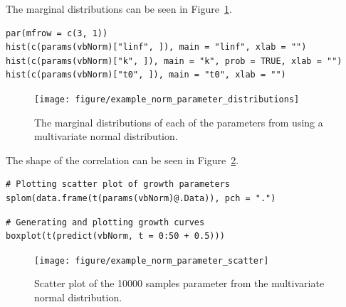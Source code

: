\documentclass[a4paper,english,10pt]{article}\usepackage[]{graphicx}\usepackage[]{color}
\makeatletter
\newenvironment{kframe}{%
 \def\at@end@of@kframe{}%
 \ifinner\ifhmode%
  \def\at@end@of@kframe{\end{minipage}}%
  \begin{minipage}{\columnwidth}%
 \fi\fi%
 \def\FrameCommand##1{\hskip\@totalleftmargin \hskip-\fboxsep
 \colorbox{shadecolor}{##1}\hskip-\fboxsep
     \hskip-\linewidth \hskip-\@totalleftmargin \hskip\columnwidth}%
 \MakeFramed {\advance\hsize-\width
   \@totalleftmargin\z@ \linewidth\hsize
   \@setminipage}}%
 {\par\unskip\endMakeFramed%
 \at@end@of@kframe}
\newenvironment{knitrout}{}{} %
\makeatother
\begin{document}
The marginal distributions can be seen in Figure~\ref{fig:plot_norm_params}.
\begin{knitrout}
\color{fgcolor}\begin{kframe}
\begin{verbatim}
par(mfrow = c(3, 1))
hist(c(params(vbNorm)["linf", ]), main = "linf", xlab = "")
hist(c(params(vbNorm)["k", ]), main = "k", prob = TRUE, xlab = "")
hist(c(params(vbNorm)["t0", ]), main = "t0", xlab = "")
\end{verbatim}
\end{kframe}
\end{knitrout}


\begin{figure}[h]
\begin{knitrout}
\color{fgcolor}

{\centering \texttt{[image: figure/example\_norm\_parameter\_distributions]} 

}



\end{knitrout}

\caption{The marginal distributions of each of the parameters from using a multivariate normal distribution.}
\label{fig:plot_norm_params}
\end{figure}

The shape of the correlation can be seen in Figure~\ref{fig:plot_norm_scatter}.
\begin{knitrout}
\color{fgcolor}\begin{kframe}
\begin{verbatim}
# Plotting scatter plot of growth parameters
splom(data.frame(t(params(vbNorm)@.Data)), pch = ".")
\end{verbatim}
\end{kframe}
\end{knitrout}


\begin{knitrout}
\color{fgcolor}\begin{kframe}
\begin{verbatim}
# Generating and plotting growth curves
boxplot(t(predict(vbNorm, t = 0:50 + 0.5)))
\end{verbatim}
\end{kframe}
\end{knitrout}


\begin{figure}[h]
\begin{knitrout}
\color{fgcolor}

{\centering \texttt{[image: figure/example\_norm\_parameter\_scatter]} 

}



\end{knitrout}

\caption{Scatter plot of the 10000 samples parameter from the multivariate normal distribution.}
\label{fig:plot_norm_scatter}
\end{figure}
\end{document}
